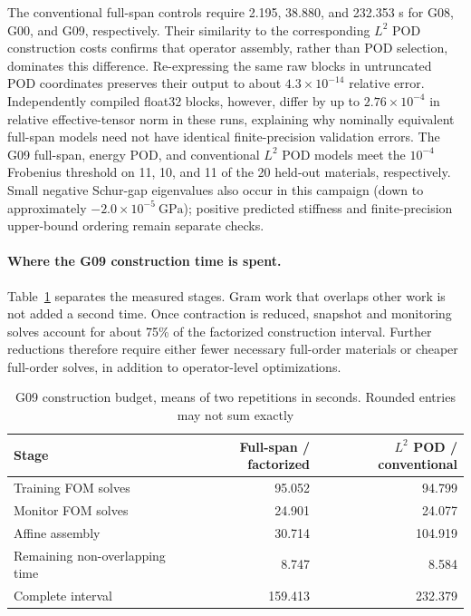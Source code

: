 \documentclass[pdflatex,sn-basic,Numbered]{sn-jnl}
\begin{document}
The conventional full-span controls require 2.195, 38.880, and 232.353 s
for G08, G00, and G09, respectively. Their similarity to the corresponding
\(L^2\) POD construction costs confirms that operator assembly, rather than
POD selection, dominates this difference. Re-expressing the same raw blocks
in untruncated POD coordinates preserves their output to about
\(4.3\times10^{-14}\) relative error. Independently compiled float32 blocks,
however, differ by up to \(2.76\times10^{-4}\) in relative effective-tensor
norm in these runs, explaining why nominally equivalent full-span models
need not have identical finite-precision validation errors. The G09 full-span, energy POD, and
conventional \(L^2\) POD models meet the \(10^{-4}\) Frobenius threshold
on 11, 10, and 11 of the 20 held-out materials, respectively. Small negative
Schur-gap eigenvalues also occur in this campaign (down to approximately
\(-2.0\times10^{-5}~\si{\giga\pascal}\)); positive predicted stiffness
and finite-precision upper-bound ordering remain separate checks.

\paragraph{Where the G09 construction time is spent.}
Table~\ref{tab:g09_budget} separates the measured stages. Gram work that
overlaps other work is not added a second time. Once contraction is reduced,
snapshot and monitoring solves account for about 75\% of the factorized
construction interval. Further reductions therefore require either fewer
necessary full-order materials or cheaper full-order solves, in addition to
operator-level optimizations.

\begin{table}[t]
\centering
\caption{G09 construction budget, means of two repetitions in seconds. Rounded entries may not sum exactly}
\label{tab:g09_budget}
\begin{tabular}{@{}lrr@{}}
\toprule
Stage & Full-span / factorized & \(L^2\) POD / conventional \\
\midrule
Training FOM solves & 95.052 & 94.799 \\
Monitor FOM solves & 24.901 & 24.077 \\
Affine assembly & 30.714 & 104.919 \\
Remaining non-overlapping time & 8.747 & 8.584 \\
\midrule
Complete interval & 159.413 & 232.379 \\
\bottomrule
\end{tabular}
\end{table}
\end{document}
